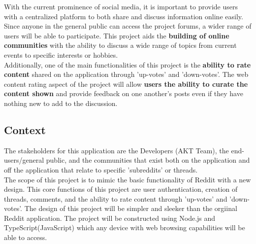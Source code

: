 \documentclass[12pt,fleqn]{article}
\begin{document}
With the current prominence of social media, it is important to provide users with a centralized platform to both share and discuss information online easily.  Since anyone in the general public can access the project forums, a wider range of users will be able to participate.  This project aids the \textbf{building of online communities} with the ability to discuss a wide range of topics from current events to specific interests or hobbies. \\
\newline
Additionally, one of the main functionalities of this project is the \textbf{ability to rate content} shared on the application through 'up-votes' and 'down-votes'.  The web content rating aspect of the project will allow \textbf{users the ability to curate the content shown} and provide feedback on one another's posts even if they have nothing new to add to the discussion.  

\subsection{Context}

The stakeholders for this application are the Developers (AKT Team), the end-users/general public, and the communities that exist both on the application and off the application that relate to specific 'subreddits' or threads.\\
\newline
The scope of this project is to mimic the basic functionality of Reddit with a new design.  This core functions of this project are user authentication, creation of threads, comments, and the ability to rate content through 'up-votes' and 'down-votes'.  \color{red}The design of this project will be simpler and sleeker than the orgiinal Reddit application.  The project will be constructed using Node.js and TypeScript(JavaScript) which any device with web browsing capabilities will be able to access.   
\end{document}
